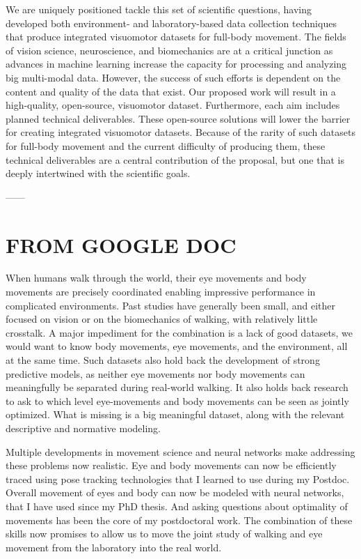We are uniquely positioned tackle this set of scientific questions, having developed both environment- and laboratory-based data collection techniques that produce integrated visuomotor datasets for full-body movement.  The fields of vision science, neuroscience, and biomechanics are at a critical junction as advances in machine learning increase the capacity for processing and analyzing big multi-modal data.  However, the success of such efforts is dependent on the content and quality of the data that exist.  Our proposed work will result in a high-quality, open-source, visuomotor dataset.  Furthermore, each aim includes planned technical deliverables.  These open-source solutions will lower the barrier for creating integrated visuomotor datasets. Because of the rarity of such datasets for full-body movement and the current difficulty of producing them, these technical deliverables are a central contribution of the proposal, but one that is deeply intertwined with the scientific goals.





------

\section*{ FROM GOOGLE DOC}

When humans walk through the world, their eye movements and body movements are precisely coordinated enabling impressive performance in complicated environments. Past studies have generally been small, and either focused on vision or on the biomechanics of walking, with relatively little crosstalk. A major impediment for the combination is a lack of good datasets, we would want to know body movements, eye movements, and the environment, all at the same time. Such datasets also hold back the development of strong predictive models, as neither eye movements nor body movements can meaningfully be separated during real-world walking. It also holds back research to ask to which level eye-movements and body movements can be seen as jointly optimized. What is missing is a big meaningful dataset, along with the relevant descriptive and normative modeling.

Multiple developments in movement science and neural networks make addressing these problems now realistic. Eye and body movements can now be efficiently traced using pose tracking technologies that I learned to use during my Postdoc. Overall movement of eyes and body can now be modeled with neural networks, that I have used since my PhD thesis. And asking questions about optimality of movements has been the core of my postdoctoral work. The combination of these skills now promises to allow us to move the joint study of walking and eye movement from the laboratory into the real world.


